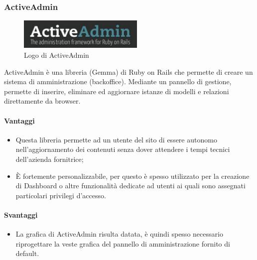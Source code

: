 \subsubsection{ActiveAdmin}
\label{sec:ActiveAdmin}
\begin{figure}[H]
\begin{center}
\includegraphics[width=6cm]{Pics/ActiveAdmin_logo.png}
\caption{Logo di ActiveAdmin}
\label{fig:ActiveAdminLogo}
\end{center}
\end{figure}
ActiveAdmin è una libreria (Gemma) di Ruby on Rails che permette di creare un sistema di amministrazione (backoffice). Mediante un pannello di gestione, permette di inserire, eliminare ed aggiornare istanze di modelli e relazioni direttamente da browser. 
\paragraph{Vantaggi}
\begin{itemize}
	\item Questa libreria permette ad un utente del sito di essere autonomo nell'aggiornamento dei contenuti senza dover attendere i tempi tecnici dell'azienda fornitrice;
	\item È fortemente personalizzabile, per questo è spesso utilizzato per la creazione di Dashboard o altre funzionalità dedicate ad utenti ai quali sono assegnati particolari privilegi d'accesso.
\end{itemize}
\paragraph{Svantaggi}
\begin{itemize}
	\item La grafica di ActiveAdmin risulta datata, è quindi spesso necessario riprogettare la veste grafica del pannello di amministrazione fornito di default.
\end{itemize}
